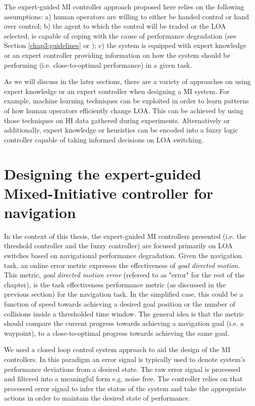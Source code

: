 \documentclass[a4paper,12pt,oneside,openright]{bhamthesis}
\begin{document}
The expert-guided MI controller approach proposed here relies on the following assumptions: a) human operators are willing to either be handed control or hand over control; b) the agent to which the control will be traded or the LOA selected, is capable of coping with the cause of performance degradation (see Section \ref{chap3:guidelines} or \cite{Chiou2015}); c) the system is equipped with expert knowledge or an expert controller providing information on how the system should be performing (i.e. close-to-optimal performance) in a given task. 

As we will discuss in the later sections, there are a variety of approaches on using expert knowledge or an expert controller when designing a MI system. For example, machine learning techniques can be exploited in order to learn patterns of how human operators efficiently change LOA. This can be achieved by using those techniques on HI data gathered during experiments. Alternatively or additionally, expert knowledge or heuristics can be encoded into a fuzzy logic controller capable of taking informed decisions on LOA switching.


\section{Designing the expert-guided Mixed-Initiative controller for navigation}
\label{chapter5:designing_MI_nav}

In the context of this thesis, the expert-guided MI controllers presented (i.e. the threshold controller and the fuzzy controller) are focused primarily on LOA switches based on navigational performance degradation. Given the navigation task, an online error metric expresses the effectiveness of \textit{goal directed motion}. This metric, \textit{goal directed motion error} (refereed to as "error" for the rest of the chapter), is the task effectiveness performance metric (as discussed in the previous section) for the navigation task. In the simplified case, this could be a function of speed towards achieving a desired goal position \cite{Olsen2003} or the number of collisions inside a thresholded time window. The general idea is that the metric should compare the current progress towards achieving a navigation goal (i.e. a waypoint), to a close-to-optimal progress towards achieving the same goal. 

We used a closed loop control system approach to aid the design of the MI controllers. In this paradigm an error signal is typically used to denote system's performance deviations from a desired state. The raw error signal is processed and filtered into a meaningful form e.g. noise free. The controller relies on that processed error signal to infer the status of the system and take the appropriate actions in order to maintain the desired state of performance. 
\end{document}
